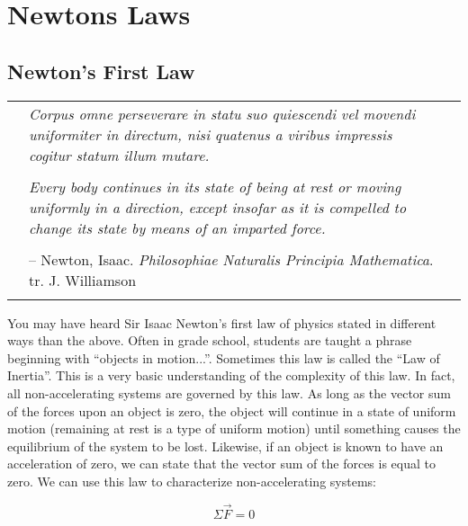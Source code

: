 \chapter{Newtons Laws} 
	\section{Newton's First Law}  
	\begin{tabular}{p{.75in} p{4.5in} p{.75in}}
		 & \textit{Corpus omne perseverare in statu suo quiescendi vel movendi uniformiter in directum, nisi quatenus a viribus impressis cogitur statum illum mutare.} &  \\
		  & & \\
		 & \textit{Every body continues in its state of being at rest or moving uniformly in a direction, except insofar as it is compelled to change its state by means of an imparted force. } & \\
		 & & \\

		&  -- Newton, Isaac.  \textit{Philosophiae Naturalis Principia Mathematica}.  tr. J. Williamson & \\
		& & \\
	\end{tabular}

	

	
  You may have heard Sir Isaac Newton's first law of physics stated in different ways than the above.  Often in grade school, students are taught a phrase beginning with ``objects in motion...''.  	Sometimes this law is called the ``Law of Inertia''.   This is a very basic understanding of the complexity of this law.  In fact, all non-accelerating systems are governed by this law.  As long as the vector sum of the forces upon an object is zero, the object will continue in a state of uniform motion (remaining at rest is a type of uniform motion) until something causes the equilibrium of the system to be lost.  
	Likewise, if an object is known to have an acceleration of zero, we can state that the vector sum of the forces is equal to zero.  We can use this law to characterize non-accelerating systems:
	
				\begin{mdframed}[backgroundcolor=orange!20!white]
		\begin{equation}
			\Sigma \vec{F} = 0  
			\label{eqn:newtonsfirst}
		\end{equation}
	\end{mdframed}
	
